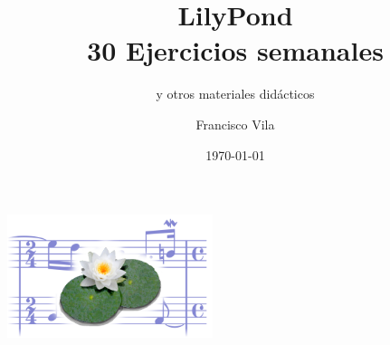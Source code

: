 \documentclass[10pt,a4paper,oneside,headinclude,titlepage]{scrartcl}
\title{LilyPond\\30 Ejercicios semanales}
\subtitle{y otros materiales didácticos}
\author{Francisco Vila}
\date{\today}
\begin{document}
\nonfrenchspacing

\begin{titlepage} %
  \makeatletter
  \begin{center}
    \vfill
    \includegraphics[width=60mm]{lily-logo.png}\par
    \vfill
    \textbf{\huge\@title}\par
    \textbf{\large\@subtitle}\par
    {\@date}
    \vfill
    \textbf{\large\@author}
    \vfill
  \end{center}
  \makeatother
\end{titlepage}


\begin{singlespace} %

\begingroup
\makeatletter
{}
\makeatother
  \setcounter{tocdepth}{1}
  \tableofcontents
\endgroup

\end{singlespace}
 
 
 
 
 
 
 
 
 
 
 
 
 
 
 
 
 
 
 
 
 
 
 
 
 
 
 
 
 
 
 
 
 \appendix
 
 
 
\end{document}
